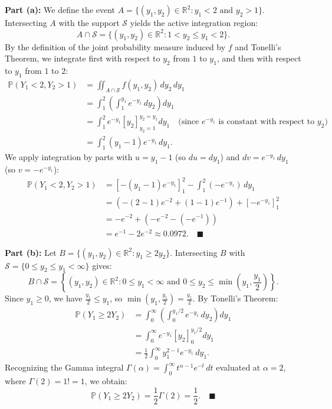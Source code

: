 \documentclass[11pt, letterpaper]{article}
\theoremstyle{definition}
\theoremstyle{remark}
\newcommand{\Prob}{\mathbb{P}}
\begin{document}
\textbf{Part (a):} We define the event $A = \{(y_1, y_2) \in \mathbb{R}^2 : y_1 < 2 \text{ and } y_2 > 1\}$. Intersecting $A$ with the support $\mathcal{S}$ yields the active integration region:
\[ A \cap \mathcal{S} = \{(y_1, y_2) \in \mathbb{R}^2 : 1 < y_2 \le y_1 < 2\}. \]
By the definition of the joint probability measure induced by $f$ and Tonelli's Theorem, we integrate first with respect to $y_2$ from $1$ to $y_1$, and then with respect to $y_1$ from $1$ to $2$:
\begin{align*}
    \Prob(Y_1 < 2, Y_2 > 1) &= \iint_{A \cap \mathcal{S}} f(y_1, y_2) \, dy_2 \, dy_1 \\
    &= \int_1^2 \left( \int_1^{y_1} e^{-y_1} \, dy_2 \right) dy_1 \\
    &= \int_1^2 e^{-y_1} \left[ y_2 \right]_{y_2=1}^{y_2=y_1} dy_1 \quad \text{(since $e^{-y_1}$ is constant with respect to $y_2$)} \\
    &= \int_1^2 (y_1 - 1) e^{-y_1} \, dy_1.
\end{align*}
We apply integration by parts with $u = y_1 - 1$ (so $du = dy_1$) and $dv = e^{-y_1} \, dy_1$ (so $v = -e^{-y_1}$):
\begin{align*}
    \Prob(Y_1 < 2, Y_2 > 1) &= \left[ -(y_1 - 1)e^{-y_1} \right]_1^2 - \int_1^2 (-e^{-y_1}) \, dy_1 \\
    &= \left( -(2 - 1)e^{-2} + (1 - 1)e^{-1} \right) + \left[ -e^{-y_1} \right]_1^2 \\
    &= -e^{-2} + \left( -e^{-2} - (-e^{-1}) \right) \\
    &= e^{-1} - 2e^{-2} \approx 0.0972. \quad \blacksquare
\end{align*}

\textbf{Part (b):} Let $B = \{(y_1, y_2) \in \mathbb{R}^2 : y_1 \ge 2y_2\}$. Intersecting $B$ with $\mathcal{S} = \{0 \le y_2 \le y_1 < \infty\}$ gives:
\[ B \cap \mathcal{S} = \left\{(y_1, y_2) \in \mathbb{R}^2 : 0 \le y_1 < \infty \text{ and } 0 \le y_2 \le \min\left(y_1, \frac{y_1}{2}\right)\right\}. \]
Since $y_1 \ge 0$, we have $\frac{y_1}{2} \le y_1$, so $\min\left(y_1, \frac{y_1}{2}\right) = \frac{y_1}{2}$. By Tonelli's Theorem:
\begin{align*}
    \Prob(Y_1 \ge 2Y_2) &= \int_0^\infty \left( \int_0^{y_1/2} e^{-y_1} \, dy_2 \right) dy_1 \\
    &= \int_0^\infty e^{-y_1} \left[ y_2 \right]_0^{y_1/2} dy_1 \\
    &= \frac{1}{2} \int_0^\infty y_1^{2-1} e^{-y_1} \, dy_1.
\end{align*}
Recognizing the Gamma integral $\Gamma(\alpha) = \int_0^\infty t^{\alpha-1}e^{-t} \, dt$ evaluated at $\alpha = 2$, where $\Gamma(2) = 1! = 1$, we obtain:
\[ \Prob(Y_1 \ge 2Y_2) = \frac{1}{2} \Gamma(2) = \frac{1}{2}. \quad \blacksquare \]
\end{document}
